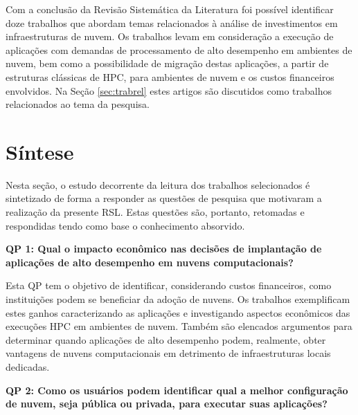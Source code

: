 \documentclass[tese,capa]{texufpel}
\begin{document}
Com a conclusão da Revisão Sistemática da Literatura foi possível identificar doze trabalhos que abordam temas relacionados à análise de investimentos em infraestruturas de nuvem. Os trabalhos levam em consideração a execução de aplicações com demandas de processamento de alto desempenho em ambientes de nuvem, bem como a possibilidade de migração destas aplicações, a partir de estruturas clássicas de HPC, para ambientes de nuvem e os custos financeiros envolvidos. Na Seção \ref{sec:trabrel} estes artigos são discutidos como trabalhos relacionados ao tema da pesquisa.

\section{Síntese}\label{sec:sintese}

Nesta seção, o estudo decorrente da leitura dos trabalhos selecionados é sintetizado de forma a responder as questões de pesquisa que motivaram a realização da presente RSL. Estas questões são, portanto, retomadas e respondidas tendo como base o conhecimento absorvido.

\textbf{QP 1: Qual o impacto econômico nas decisões de implantação de aplicações de alto desempenho em nuvens computacionais?}

Esta QP tem o objetivo de identificar, considerando custos financeiros, como instituições podem se beneficiar da adoção de nuvens. Os trabalhos \cite{roloffHighPerformanceComputing2012c, sadooghiUnderstandingPerformancePotential2017d} exemplificam estes ganhos caracterizando as aplicações e investigando aspectos econômicos das execuções HPC em ambientes de nuvem. Também são elencados argumentos para determinar quando aplicações de alto desempenho podem, realmente, obter vantagens de nuvens computacionais em detrimento de infraestruturas locais dedicadas.

\textbf{QP 2: Como os usuários podem identificar qual a melhor configuração de nuvem, seja pública ou privada, para executar suas aplicações?}
\end{document}
